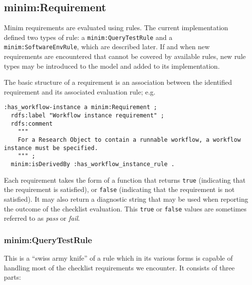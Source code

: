 \documentclass[]{article}
\begin{document}
\subsection{minim:Requirement}

Minim requirements are evaluated using rules. The current implementation
defined two types of rule: a \texttt{minim:QueryTestRule} and a
\texttt{minim:SoftwareEnvRule}, which are described later. If and when
new requirements are encountered that cannot be covered by available
rules, new rule types may be introduced to the model and added to its
implementation.

The basic structure of a requirement is an association between the
identified requirement and its associated evaluation rule; e.g.

\begin{verbatim}
:has_workflow-instance a minim:Requirement ;
  rdfs:label "Workflow instance requirement" ;
  rdfs:comment
    """
    For a Research Object to contain a runnable workflow, a workflow instance must be specified.
    """ ;
  minim:isDerivedBy :has_workflow_instance_rule .
\end{verbatim}

Each requirement takes the form of a function that returns \texttt{true}
(indicating that the requirement is satisfied), or \texttt{false}
(indicating that the requirement is not satisfied). It may also return a
diagnostic string that may be used when reporting the outcome of the
checklist evaluation. This \texttt{true} or \texttt{false} values are
sometimes referred to as \emph{pass} or \emph{fail}.

\subsubsection{minim:QueryTestRule}

This is a ``swiss army knife'' of a rule which in its various forms is
capable of handling most of the checklist requirements we encounter. It
consists of three parts:
\end{document}
